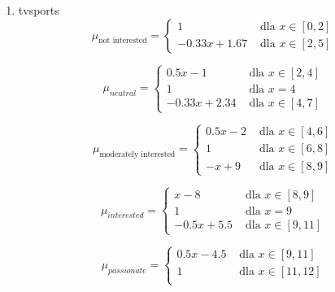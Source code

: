 \documentclass{classrep}
\begin{document}
\begin{enumerate}
  \item tvsports 
  \begin{equation}
    \mu_{\text{not interested}} =
      \begin{cases}
        1 & \text{ dla } x \in [0,2] \\
        -0.33x+1.67 & \text{ dla } x \in [2,5]       
      \end{cases}  
  \end{equation}

  \begin{equation}
    \mu_{neutral} =
      \begin{cases}
        0.5x-1 & \text{ dla } x \in [2,4]\\
        1 & \text{ dla } x=4 \\
        -0.33x+2.34 & \text{ dla } x \in [4,7]       
      \end{cases}  
  \end{equation}

  \begin{equation}
    \mu_{\text{moderately interested}} =
      \begin{cases}
        0.5x-2 & \text{ dla } x \in [4,6]\\
        1 & \text{ dla } x \in [6,8] \\
        -x+9 & \text{ dla } x \in [8,9]       
      \end{cases}  
  \end{equation}

  \begin{equation}
    \mu_{interested} =
      \begin{cases}
        x-8 & \text{ dla } x \in [8,9]\\
        1 & \text{ dla } x =9 \\
        -0.5x+5.5 & \text{ dla } x \in [9,11]       
      \end{cases}  
  \end{equation}

  \begin{equation}
    \mu_{passionate} =
      \begin{cases}
        0.5x-4.5 & \text{ dla } x \in [9,11]\\
        1 & \text{ dla } x \in [11,12] \\
     
      \end{cases}  
  \end{equation}


\end{enumerate}
\end{document}
